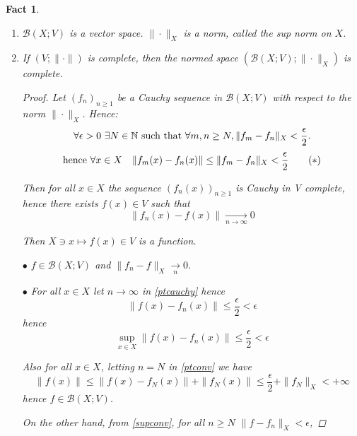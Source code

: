 \documentclass[12pt]{amsbook}
\newtheorem{fact}[theorem]{Fact}
\theoremstyle{definition}
\newcommand{\NN}{{\mathbb N}}
\newcommand{\cB}{{\mathcal B}}
\newcommand{\ra}{\rightarrow} %
\begin{document}
\begin{fact} \
\begin{enumerate}
\item $\cB(X; V)$ is a vector space. $\|\cdot\|_X$ is a norm, called the \emph{sup norm} on $X$.
\item If $(V; \|\cdot\|)$ is complete, then the normed space $(\cB(X; V); \|\cdot\|_X)$ is complete.
\begin{proof}
Let $(f_n)_{n \geq 1}$ be a Cauchy sequence in $\cB(X; V)$ with respect to the norm $\|\cdot\|_X$. Hence:
\begin{equation*}
\forall \epsilon > 0 \ \exists N \in \NN \textup{ such that } \forall m, n \geq N, \|f_m - f_n\|_X < \frac{\epsilon}{2}.
\end{equation*}
\begin{equation}
\textup{hence } \forall x \in X \quad \|f_m(x) - f_n(x)\| \leq \|f_m - f_n\|_X < \frac{\epsilon}{2} \label{ptcauchy} \tag{$*$}
\end{equation}

Then for all $x \in X$ the sequence $(f_n(x))_{n \geq 1}$ is Cauchy in V complete, hence there exists $f(x) \in V$ such that
\begin{equation*} \|f_n(x) - f(x)\| \xrightarrow[n \ra \infty]{} 0 \end{equation*}

Then $X \ni x \mapsto f(x) \in V$ is a function. %

$\bullet$ $f \in \cB(X; V)$ and $\|f_n - f\|_X \xrightarrow[n]{} 0$.


$\bullet$ For all $x \in X$ let $n \ra \infty$ in \eqref{ptcauchy} hence
\begin{equation}
\|f(x) - f_n(x)\| \leq \frac{\epsilon}{2} < \epsilon \label{ptconv} \tag{$**$}
\end{equation}
hence
\begin{equation}
\sup_{x \in X} \|f(x) - f_n(x)\| \leq \frac{\epsilon}{2} < \epsilon \label{supconv} \tag{$***$}
\end{equation}

Also for all $x \in X$, letting $n = N$ in \eqref{ptconv} we have
\begin{equation*}
\|f(x)\| \leq \|f(x) - f_N(x)\| + \|f_N(x)\| \leq \frac{\epsilon}{2} + \|f_N\|_X < +\infty
\end{equation*}
hence $f \in \cB(X; V)$.

On the other hand, from \eqref{supconv}, for all $n \geq N$ $\|f - f_n\|_X < \epsilon$,


\end{proof}
\end{enumerate}
\end{fact}
\end{document}
